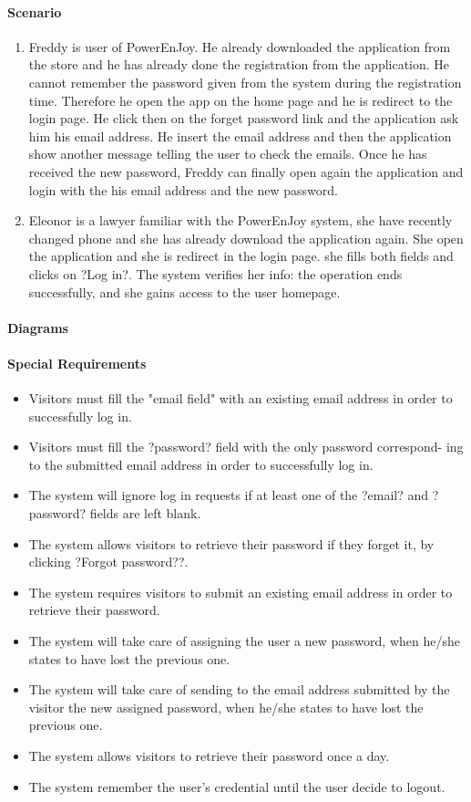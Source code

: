 \paragraph{Scenario}
\begin {enumerate}
\item Freddy is user of PowerEnJoy. He already downloaded the application from the store and he has already done the registration from the application. He cannot remember the password given from the system during the registration time. Therefore he open the app on the home page and he is redirect to the login page. He click then on the forget password link and the application ask him his email address. He insert the email address and then the application show another message telling the user to check the emails. Once he has received the new password, Freddy can finally open again the application and login with the his email address and the new password.
\item Eleonor is a lawyer familiar with the PowerEnJoy system, she have recently changed phone and she has already download the application again. She open the application and she is redirect in the login page. she fills both fields and clicks on ?Log in?. The system verifies her info: the operation ends successfully, and she gains access to the user homepage.
\end{enumerate}
\paragraph{Diagrams}
\paragraph{Special Requirements}
\begin{itemize}
	\item Visitors must fill the "email field" with an existing email address in order to successfully log in.
	\item Visitors must fill the ?password? field with the only password correspond- ing to the submitted email address in order to successfully log in.
	\item The system will ignore log in requests if at least one of the ?email? and ?password? fields are left blank.
	\item The system allows visitors to retrieve their password if they forget it, by clicking ?Forgot password??.
	\item The system requires visitors to submit an existing email address in order to retrieve their password.
	\item The system will take care of assigning the user a new password, when he/she states to have lost the previous one.
	\item The system will take care of sending to the email address submitted by the visitor the new assigned password, when he/she states to have lost the previous one.
	\item The system allows visitors to retrieve their password once a day.
	\item The system remember the user's credential until the user decide to logout.
\end{itemize}

